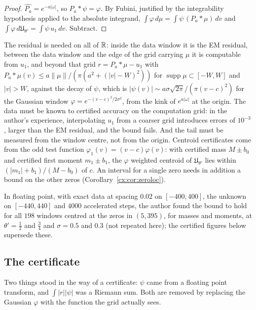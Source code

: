 \begin{proof}
$\widehat{P_a}=e^{-a|\omega|}$, so $P_a*\psi=\varphi$. By Fubini, justified by the integrability hypothesis applied to the absolute integrand, $\int\varphi\,d\mu=\int\psi\,(P_a*\mu)\,dv$ and $\int\varphi\,d\mathfrak U_{\theta'}=\int\psi\,u_1\,dv$. Subtract.
\end{proof}

The residual is needed on all of $\mathbb{R}$: inside the data window it is the EM residual, between the data window and the edge of the grid carrying $\mu$ it is computable from $u_1$, and beyond that grid $r=P_a*\mu-u_1$ with $P_a*\mu(v)\le a\|\mu\|/(\pi(a^2+(|v|-W)^2))$ for $\operatorname{supp}\mu\subset[-W,W]$ and $|v|>W$, against the decay of $\psi$, which is $|\psi(v)|\sim a\sigma\sqrt{2\pi}/(\pi(v-c)^2)$ for the Gaussian window $\varphi=e^{-(v-c)^2/2\sigma^2}$, from the kink of $e^{a|\omega|}$ at the origin. The data must be known to certified accuracy on the computation grid: in the author's experience, interpolating $u_1$ from a coarser grid introduces errors of $10^{-3}$, larger than the EM residual, and the bound fails. And the tail must be measured from the window centre, not from the origin. Centroid certificates come from the odd test function $\varphi_1(v)=(v-c)\varphi(v)$: with certified mass $M\pm b_0$ and certified first moment $m_1\pm b_1$, the $\varphi$ weighted centroid of $\mathfrak U_{\theta'}$ lies within $(|m_1|+b_1)/(M-b_0)$ of $c$. An interval for a single zero needs in addition a bound on the other zeros (Corollary~\ref{cx:cor:zeroloc}).

In floating point, with exact data at spacing $0.02$ on $[-400,400]$, the unknown on $[-440,440]$ and $4000$ accelerated steps, the author found the bound to hold for all $198$ windows centred at the zeros in $(5,395)$, for masses and moments, at $\theta'=\tfrac12$ and $\tfrac34$ and $\sigma=0.5$ and $0.3$ (not repeated here); the certified figures below supersede these.

\subsection{The certificate}\label{cx:sec:apostcert}

Two things stood in the way of a certificate: $\psi$ came from a floating point transform, and $\int|r||\psi|$ was a Riemann sum. Both are removed by replacing the Gaussian $\varphi$ with the function the grid actually sees.

